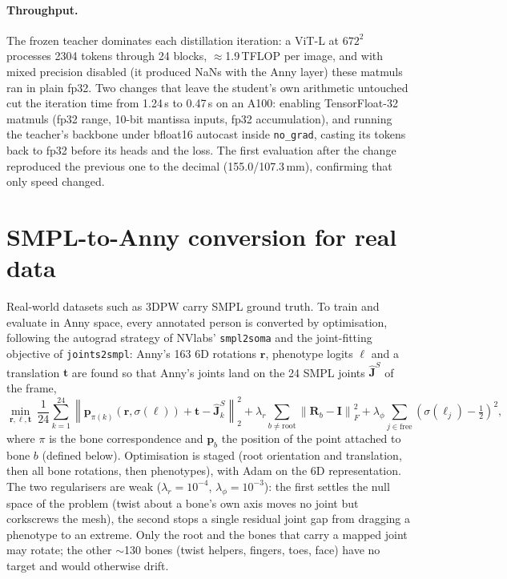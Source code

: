 \paragraph{Throughput.} The frozen teacher dominates each distillation
iteration: a ViT-L at $672^2$ processes 2304 tokens through 24 blocks,
$\approx$1.9\,TFLOP per image, and with mixed precision disabled (it produced
NaNs with the Anny layer) these matmuls ran in plain fp32. Two changes that
leave the student's own arithmetic untouched cut the iteration time from
1.24\,s to 0.47\,s on an A100: enabling TensorFloat-32 matmuls (fp32 range,
10-bit mantissa inputs, fp32 accumulation), and running the teacher's backbone
under bfloat16 autocast inside \texttt{no\_grad}, casting its tokens back to
fp32 before its heads and the loss. The first evaluation after the change
reproduced the previous one to the decimal (155.0/107.3\,mm), confirming that
only speed changed.

\section{SMPL-to-Anny conversion for real data}
\label{sec:smpl2anny}

Real-world datasets such as 3DPW carry SMPL ground truth. To train and
evaluate in Anny space, every annotated person is converted by optimisation,
following the autograd strategy of NVlabs' \texttt{smpl2soma} and the
joint-fitting objective of \texttt{joints2smpl}: Anny's 163 6D rotations
$\mathbf{r}$, phenotype logits $\boldsymbol{\ell}$ and a translation
$\mathbf{t}$ are found so that Anny's joints land on the 24 SMPL joints
$\hat{\mathbf{J}}^{S}$ of the frame,
\begin{equation}
\min_{\mathbf{r},\boldsymbol{\ell},\mathbf{t}}
\ \frac{1}{24}\sum_{k=1}^{24}
\left\| \mathbf{p}_{\pi(k)}\!\left(\mathbf{r},\sigma(\boldsymbol{\ell})\right)
 + \mathbf{t} - \hat{\mathbf{J}}^{S}_{k}\right\|_2^2
 + \lambda_{r}\sum_{b\neq\text{root}}\left\|\mathbf{R}_b-\mathbf{I}\right\|_F^2
 + \lambda_{\phi}\sum_{j\in\text{free}}\left(\sigma(\ell_j)-\tfrac12\right)^2 ,
\label{eq:fit}
\end{equation}
where $\pi$ is the bone correspondence and $\mathbf{p}_{b}$ the position of the
point attached to bone $b$ (defined below). Optimisation is staged (root
orientation and translation, then all bone rotations, then phenotypes), with
Adam on the 6D representation. The two regularisers are weak
($\lambda_r{=}10^{-4}$, $\lambda_\phi{=}10^{-3}$): the first settles the null
space of the problem (twist about a bone's own axis moves no joint but
corkscrews the mesh), the second stops a single residual joint gap from
dragging a phenotype to an extreme. Only the root and the bones that carry a
mapped joint may rotate; the other $\sim$130 bones (twist helpers, fingers,
toes, face) have no target and would otherwise drift.

